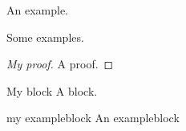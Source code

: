 \documentclass{beamer}
\begin{document}
\begin{frame}[allowframebreaks]
    \begin{example}[My example]
        An example.
    \end{example}

    \begin{examples}[My examples]
        Some examples.
    \end{examples}

    \begin{proof}[My proof]
        A proof.
    \end{proof}


    \begin{block}{My block}
        A block.
    \end{block}

    \begin{exampleblock}{my exampleblock}
            An exampleblock
    \end{exampleblock}

\end{frame}
\end{document}
